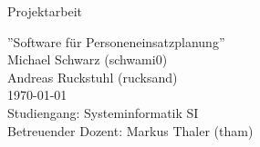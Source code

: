 %
%

\begin{titlepage}
\vspace{4em}
\center

\Large{\textsf{Projektarbeit}}
\vspace{1em}

\Huge{\textsf{''Software für Personeneinsatzplanung''}}
\vspace{2em}
\\
\Large{
	\textsf{
		Michael Schwarz (schwami0)\\
		Andreas Ruckstuhl (rucksand)\\
		\vspace{2em}
		\today\\
		\vspace{2em}
		Studiengang: Systeminformatik SI\\
		Betreuender Dozent: Markus Thaler (tham)
	}
}

\end{titlepage}
